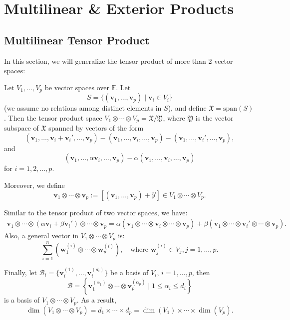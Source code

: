 \chapter{Multilinear \& Exterior Products}

\section{Multilinear Tensor Product}
In this section, we will generalize the tensor product of more than 2 vector spaces:
\begin{definition}
Let $V_1, \ldots, V_p$ be vector spaces over $\mathbb{F}$. Let 
$$S = \{(\mathbf{v}_1, \ldots, \mathbf{v}_p) \mid \mathbf{v}_i \in V_i\}$$ 
(we assume no relations among distinct elements in $S$), and define $\mathfrak{X} = \text{span}(S)$. Then the tensor product space $V_1 \otimes \cdots \otimes V_p = \mathfrak{X} / \mathfrak{Y}$, where $\mathfrak{Y}$ is the vector subspace of $\mathfrak{X}$ spanned by vectors of the form
$$(\mathbf{v}_1, \ldots, \mathbf{v}_i + \mathbf{v}_i', \ldots, \mathbf{v}_p) - (\mathbf{v}_1, \ldots, \mathbf{v}_i, \ldots, \mathbf{v}_p) - (\mathbf{v}_1, \ldots, \mathbf{v}_i', \ldots, \mathbf{v}_p),$$ 
 and
$$(\mathbf{v}_1, \ldots, \alpha \mathbf{v}_i, \ldots, \mathbf{v}_p) - \alpha (\mathbf{v}_1, \ldots, \mathbf{v}_i, \ldots, \mathbf{v}_p)$$
for $i = 1, 2, \ldots, p$.

Moreover, we define
\[\mathbf{v}_1 \otimes \cdots \otimes \mathbf{v}_p := [(\mathbf{v}_1, \ldots, \mathbf{v}_p) + \mathcal{Y}] \in V_1 \otimes \cdots \otimes V_p.\]
\end{definition}

\begin{remark} \label{rmk:mult_tensor}
Similar to the tensor product of two vector spaces, we have:
  \begin{align*}
\mathbf{v}_1 \otimes \cdots \otimes (\alpha \mathbf{v}_i + \beta \mathbf{v}_i') \otimes \cdots \otimes \mathbf{v}_p = \alpha (\mathbf{v}_1 \otimes \cdots \otimes \mathbf{v}_i \otimes \cdots \otimes \mathbf{v}_p) + \beta (\mathbf{v}_1 \otimes \cdots \otimes \mathbf{v}_i' \otimes \cdots \otimes \mathbf{v}_p).
  \end{align*}
Also, a general vector in $V_1 \otimes \cdots \otimes V_p$ is:
  \[
    \sum_{i=1}^n \left( \mathbf{w}_1^{(i)} \otimes \cdots \otimes \mathbf{w}_p^{(i)} \right), \quad \text{where } \mathbf{w}_j^{(i)} \in V_j, j = 1, \ldots, p.
  \]

Finally, let $\mathcal{B}_i = \{\mathbf{v}_i^{(1)}, \ldots, \mathbf{v}_i^{(d_i)}\}$ be a basis of $V_i$, $i = 1, \ldots, p$, then
  \[
    \mathcal{B} = \left\{ \mathbf{v}_1^{(\alpha_1)} \otimes \cdots \otimes \mathbf{v}_p^{(\alpha_p)} \mid 1 \leq \alpha_i \leq d_i \right\}
  \]
  is a basis of $V_1 \otimes \cdots \otimes V_p$. As a result,
  \[
    \dim(V_1 \otimes \cdots \otimes V_p) = d_1 \times \cdots \times d_p = \dim(V_1) \times \cdots \times \dim(V_p).
  \]
\end{remark}

